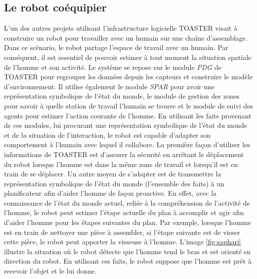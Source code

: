 \documentclass[a4paper,11pt,twoside]{StyleThese}
\begin{document}
\subsection{Le robot coéquipier}
L'un des autres projets utilisant l'infrastructure logicielle TOASTER visait à construire un robot pour travailler avec un humain sur une chaîne d'assemblage.
Dans ce scénario, le robot partage l'espace de travail avec un humain. Par conséquent, il est essentiel de pouvoir estimer à tout moment la situation spatiale de l'homme et son activité.
Le système se repose sur le module \textit{PDG} de TOASTER pour regrouper les données depuis les capteurs et construire le modèle d'environnement.
Il utilise également le module \textit{SPAR} pour avoir une représentation symbolique de l'état du monde, le module de gestion des zones pour savoir à quelle station de travail l'humain se trouve et le module de suivi des agents pour estimer l'action courante de l'homme.
En utilisant les faits provenant de ces modules, lui procurant une représentation symbolique de l'état du monde et de la situation de l'interaction, le robot est capable d'adapter son comportement à l'humain avec lequel il collabore.
La première façon d'utiliser les informations de TOASTER est d'assurer la sécurité en arrêtant le déplacement du robot lorsque l'homme est dans la même zone de travail et lorsqu'il est en train de se déplacer.
Un autre moyen de s'adapter est de transmettre la représentation symbolique  de l'état du monde (l'ensemble des faits) à un planificateur afin d'aider l'homme de façon proactive. En effet, avec la connaissance de l'état du monde actuel, reliée à la compréhension de l'activité de l'homme, le robot peut estimer l'étape actuelle du plan à accomplir et agir afin d'aider l'homme pour les étapes suivantes du plan. Par exemple, lorsque l'homme est en train de nettoyer une pièce à assembler, si l'étape suivante est de visser cette pièce, le robot peut apporter la visseuse à l'homme. L'image \ref{fig:saphari} illustre la situation où le robot détecte que l'homme tend le bras et est orienté en direction du robot. En utilisant ces faits, le robot suppose que l'homme est prêt à recevoir l'objet et le lui donne.

\end{document}
